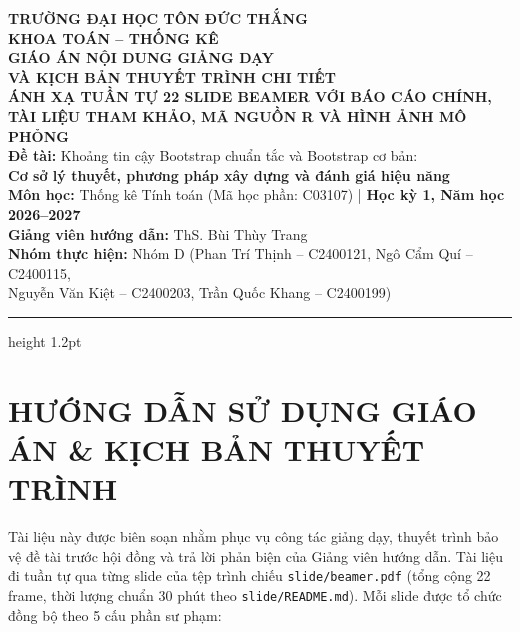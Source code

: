 \documentclass[10pt,a4paper]{article}
\begin{document}
\begin{center}
    {\large\bfseries TRƯỜNG ĐẠI HỌC TÔN ĐỨC THẮNG}\\[0.1cm]
    {\bfseries KHOA TOÁN -- THỐNG KÊ}\\[0.3cm]
    {\LARGE\bfseries\color{primary} GIÁO ÁN NỘI DUNG GIẢNG DẠY\\VÀ KỊCH BẢN THUYẾT TRÌNH CHI TIẾT}\\[0.2cm]
    {\Large\bfseries\color{secondary} ÁNH XẠ TUẦN TỰ 22 SLIDE BEAMER VỚI BÁO CÁO CHÍNH,\\TÀI LIỆU THAM KHẢO, MÃ NGUỒN R VÀ HÌNH ẢNH MÔ PHỎNG}\\[0.3cm]
    {\normalsize\textbf{Đề tài:} Khoảng tin cậy Bootstrap chuẩn tắc và Bootstrap cơ bản:}\\[0.05cm]
    {\normalsize\textbf{Cơ sở lý thuyết, phương pháp xây dựng và đánh giá hiệu năng}}\\[0.2cm]
    {\small\textbf{Môn học:} Thống kê Tính toán (Mã học phần: C03107) \quad | \quad \textbf{Học kỳ 1, Năm học 2026--2027}}\\[0.05cm]
    {\small\textbf{Giảng viên hướng dẫn:} ThS. Bùi Thùy Trang}\\[0.05cm]
    {\small\textbf{Nhóm thực hiện:} Nhóm D (Phan Trí Thịnh -- C2400121, Ngô Cẩm Quí -- C2400115,}\\[0.02cm]
    {\small Nguyễn Văn Kiệt -- C2400203, Trần Quốc Khang -- C2400199)}
\end{center}

\vspace{0.2cm}
\hrule height 1.2pt
\vspace{0.3cm}

\section*{HƯỚNG DẪN SỬ DỤNG GIÁO ÁN \& KỊCH BẢN THUYẾT TRÌNH}

Tài liệu này được biên soạn nhằm phục vụ công tác giảng dạy, thuyết trình bảo vệ đề tài trước hội đồng và trả lời phản biện của Giảng viên hướng dẫn. Tài liệu đi tuần tự qua từng slide của tệp trình chiếu \texttt{slide/beamer.pdf} (tổng cộng 22 frame, thời lượng chuẩn 30 phút theo \texttt{slide/README.md}). Mỗi slide được tổ chức đồng bộ theo 5 cấu phần sư phạm:
\end{document}

